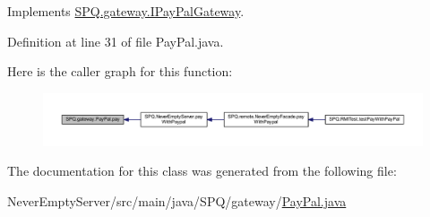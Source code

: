 Implements \mbox{\hyperlink{interface_s_p_q_1_1gateway_1_1_i_pay_pal_gateway_a064ef641b0db9c4a6d0de59089a108bf}{S\+P\+Q.\+gateway.\+I\+Pay\+Pal\+Gateway}}.



Definition at line 31 of file Pay\+Pal.\+java.

Here is the caller graph for this function\+:
\nopagebreak
\begin{figure}[H]
\begin{center}
\leavevmode
\includegraphics[width=350pt]{class_s_p_q_1_1gateway_1_1_pay_pal_a4f12e3d9fd7cc1ebf54e885df464f1d4_icgraph}
\end{center}
\end{figure}


The documentation for this class was generated from the following file\+:\begin{DoxyCompactItemize}
\item 
Never\+Empty\+Server/src/main/java/\+S\+P\+Q/gateway/\mbox{\hyperlink{_pay_pal_8java}{Pay\+Pal.\+java}}\end{DoxyCompactItemize}
